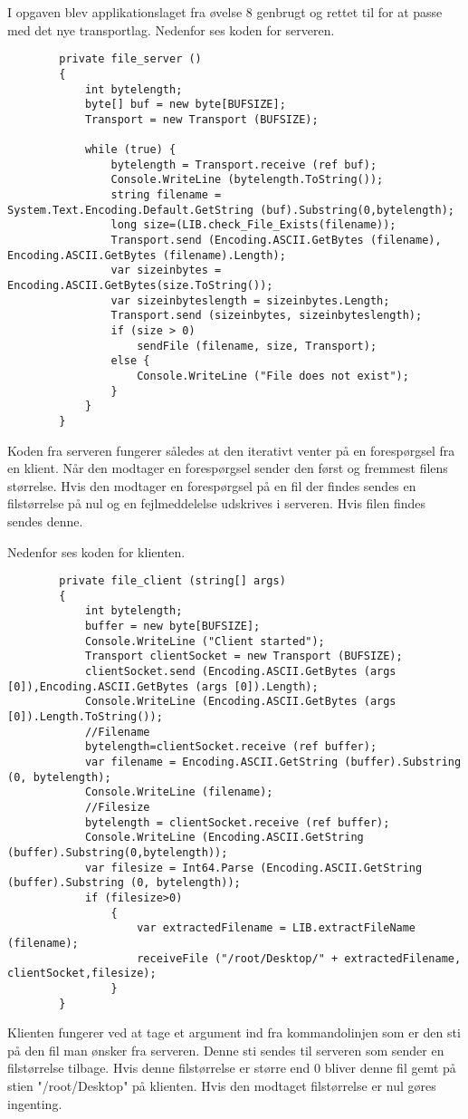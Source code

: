 I opgaven blev applikationslaget fra øvelse 8 genbrugt og rettet til for at passe med det nye transportlag. Nedenfor ses koden for serveren.

\begin{lstlisting}
		private file_server ()
		{
			int bytelength;
			byte[] buf = new byte[BUFSIZE];
			Transport = new Transport (BUFSIZE);

			while (true) {
				bytelength = Transport.receive (ref buf);
				Console.WriteLine (bytelength.ToString());
				string filename = System.Text.Encoding.Default.GetString (buf).Substring(0,bytelength);
				long size=(LIB.check_File_Exists(filename));
				Transport.send (Encoding.ASCII.GetBytes (filename), Encoding.ASCII.GetBytes (filename).Length);
				var sizeinbytes = Encoding.ASCII.GetBytes(size.ToString());
				var sizeinbyteslength = sizeinbytes.Length;
				Transport.send (sizeinbytes, sizeinbyteslength);
				if (size > 0)
					sendFile (filename, size, Transport);
				else {
					Console.WriteLine ("File does not exist");
				}
			}
		}
\end{lstlisting}

Koden fra serveren fungerer således at den iterativt venter på en forespørgsel fra en klient.  Når den modtager en forespørgsel sender den først og fremmest filens størrelse. Hvis den modtager en forespørgsel på en fil der findes sendes en filstørrelse på nul og en fejlmeddelelse udskrives i serveren. Hvis filen findes sendes denne.

Nedenfor ses koden for klienten.
\begin{lstlisting}
		private file_client (string[] args)
		{
			int bytelength;
			buffer = new byte[BUFSIZE];
			Console.WriteLine ("Client started");
			Transport clientSocket = new Transport (BUFSIZE);
			clientSocket.send (Encoding.ASCII.GetBytes (args [0]),Encoding.ASCII.GetBytes (args [0]).Length);
			Console.WriteLine (Encoding.ASCII.GetBytes (args [0]).Length.ToString());
			//Filename
			bytelength=clientSocket.receive (ref buffer);
			var filename = Encoding.ASCII.GetString (buffer).Substring (0, bytelength);
			Console.WriteLine (filename);
			//Filesize
			bytelength = clientSocket.receive (ref buffer);
			Console.WriteLine (Encoding.ASCII.GetString (buffer).Substring(0,bytelength));
			var filesize = Int64.Parse (Encoding.ASCII.GetString (buffer).Substring (0, bytelength));
			if (filesize>0)
				{
					var extractedFilename = LIB.extractFileName (filename);
					receiveFile ("/root/Desktop/" + extractedFilename, clientSocket,filesize);
				}
		}
\end{lstlisting}

Klienten fungerer ved at tage et argument ind fra kommandolinjen som er den sti på den fil man ønsker fra serveren. Denne sti sendes til serveren som sender en filstørrelse tilbage. Hvis denne filstørrelse er større end 0 bliver denne fil gemt på stien "/root/Desktop" på klienten. Hvis den modtaget filstørrelse er nul gøres ingenting.